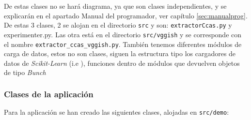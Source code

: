 De estas clases no se hará diagrama, ya que son clases independientes, y se explicarán en el apartado Manual del programador, ver capítulo \ref{sec:manualprog}. De estas 3 clases, 2 se alojan en el directorio \texttt{src} y son: \texttt{extractorCcas.py} y {experimenter.py}. Las otra está en el directorio \texttt{src/vggish} y se corresponde con el nombre \texttt{extractor\_ccas\_vggish.py}. También tenemos diferentes módulos de carga de datos, estos no son clases, siguen la estructura tipo los cargadores de datos de \textit{Scikit-Learn} (i.e ), funciones dentro de módulos que devuelven objetos de tipo \textit{Bunch}

\subsubsection{Clases de la aplicación}\label{sec:clases}
Para la aplicación se han creado las siguientes clases, alojadas en \texttt{src/demo}:
